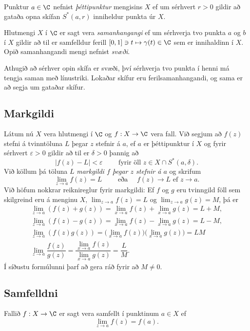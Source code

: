 Punktur $a\in \C$ nefnist {\it þéttipunktur} mengisins $X$ ef um
sérhvert $r>0$ gildir að gataða opna skífan $S^*(a,r)$ inniheldur
punkta úr $X$.  


Hlutmengi $X$ í $\C$ er sagt vera
{\it samanhangangi} ef um sérhverja tvo punkta $a$ og $b$ í 
$X$ gildir að til er samfelldur ferill  $[0,1]\ni t\mapsto \gamma(t)\in \C$ sem er
innihaldinn í $X$.   Opið samanhangandi mengi nefnist {\it svæði}.  


Athugið að sérhver opin skífa er svæði, því sérhverja tvo punkta í
henni má
tengja saman með línustriki.  Lokaðar skífur eru ferilsamanhangandi,
og sama er að segja um gataðar skífur.


\subsection*{Markgildi}

Látum nú $X$ vera hlutmengi í $\C$ og $f:X\to \C$ vera fall.  Við
segjum að $f(z)$ stefni á tvinntöluna $L$ þegar  $z$ stefnir á $a$, ef $a$ er
þéttipunktur í $X$ og fyrir sérhvert $\varepsilon>0$ gildir að til er
$\delta>0$ þannig að 
$$
|f(z)-L|<\varepsilon \qquad \text{ fyrir öll } z\in X\cap S^*(a,\delta).
$$
Við köllum þá töluna $L$ {\it markgildi $f$ þegar $z$ stefnir á $a$}
og skrifum 
$$
\lim_{z\to a}f(z)=L  \qquad \text{ eða } \quad f(z)\to L \text{ ef }
z\to a.
$$
Við höfum nokkrar reiknireglur fyrir markgildi:  Ef $f$ og $g$ eru
tvinngild föll sem skilgreind eru á menginu $X$, $\lim_{z\to a}f(z)=L$
og $\lim_{z\to a}g(z)=M$, þá er 
\begin{gather*}
\lim_{z\to a}(f(z)+g(z))=\lim_{x\to a}f(z)+\lim_{x\to a}g(z)=L+M,\\
\lim_{z\to a}(f(z)-g(z))=\lim_{x\to a}f(z)-\lim_{x\to a}g(z)=L-M,\\
\lim_{z\to a}(f(z)g(z))=\big(\lim_{x\to a}f(z)\big)\big(\lim_{x\to
a}g(z)\big)=LM\\
\lim_{z\to a}\dfrac{f(z)}{g(z)}=\dfrac{\lim_{x\to a}f(z)}{\lim_{x\to
a}g(z)}=\dfrac LM.
\end{gather*}
Í síðustu formúlunni þarf að gera ráð fyrir að $M\neq 0$.


\subsection*{Samfelldni}

Fallið $f:X\to \C$ er sagt vera samfellt í punktinum $a\in X$ ef
$$
\lim_{z\to a}f(z)=f(a).
$$


